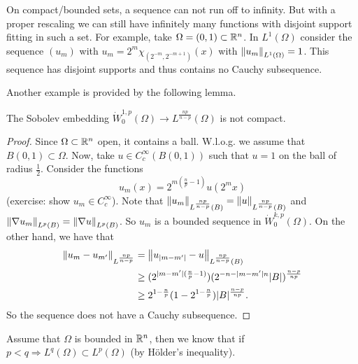 \documentclass[11pt]{article}
\begin{document}
    		On compact/bounded sets, a sequence can not run off to infinity. But with a proper rescaling we can still have infinitely many functions with disjoint support fitting in such a set. For example, take $\Omega=(0,1)\subset\mathbb{R}^n$. In $L^1(\Omega)$ consider the sequence $(u_m)$ with $u_m=2^m\chi_{(2^{-m},2^{-m+1})}(x)$ with $\norm{u_m}_{L^1(\Omega)}=1$. This sequence has disjoint supports and thus contains no Cauchy subsequence.
    
    		Another example is provided by the following lemma.
    
    		\begin{lemma}
    			The Sobolev embedding $\dot{W}^{1,p}_0(\Omega)\rightarrow L^{\frac{np}{n-p}}(\Omega)$ is not compact.
    		\end{lemma}
    		\begin{proof}
    			Since $\Omega\subset\mathbb{R}^n$ open, it contains a ball. W.l.o.g. we assume that $B(0,1)\subset\Omega$. Now, take $u\in C^\infty_c(B(0,1))$ such that $u=1$ on the ball of radius $\frac{1}{2}$. Consider the functions 
    			\begin{equation*}
    				u_m(x)=2^{m(\frac{n}{p}-1)}u(2^m x)
    			\end{equation*}
    			(exercise: show $u_m\in C^\infty_c$).
    			Note that $\norm{u_m}_{L^{\frac{np}{n-p}}(B)}=\norm{u}_{L^{\frac{np}{n-p}}(B)}$ and $\norm{\nabla u_m}_{L^p(B)}=\norm{\nabla u}_{L^p(B)}$. So $u_m$ is a bounded sequence in $\dot{W}^{k,p}_0(\Omega)$. On the other hand, we have that
    			\begin{align*}
    				\norm{u_m-u_{m^\prime}}_{L^\frac{np}{n-p}}&=\norm{u_{|m-m^\prime|}-u}_{L^\frac{np}{n-p}(B)}\\&\ge (2^{|m-m^\prime|(\frac{n}{p}-1)})(2^{-n-|m-m^\prime|n}|B|)^{\frac{n-p}{np}}\\&\ge 2^{1-\frac{n}{p}}(1-2^{1-\frac{n}{p}})|B|^\frac{n-p}{np}.
    			\end{align*}
    			So the sequence does not have a Cauchy subsequence.
    		\end{proof}
    
    		Assume that $\Omega$ is bounded in $\mathbb{R}^n$, then we know that if $p<q\Longrightarrow L^q(\Omega)\subset L^p(\Omega)$ (by H{\"o}lder's inequality).
    
\end{document}
